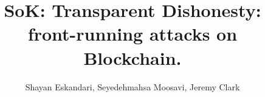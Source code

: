 \documentclass[envcountsect]{llncs}
\begin{document}
\frontmatter
\mainmatter

\title{SoK: Transparent Dishonesty: front-running attacks on Blockchain.}
\author{}

\author{
	Shayan Eskandari\inst{\ddag},
	Seyedehmahsa Moosavi\inst{\dag},
	Jeremy Clark\inst{\dag}
	}

	
	
\maketitle














\end{document}
